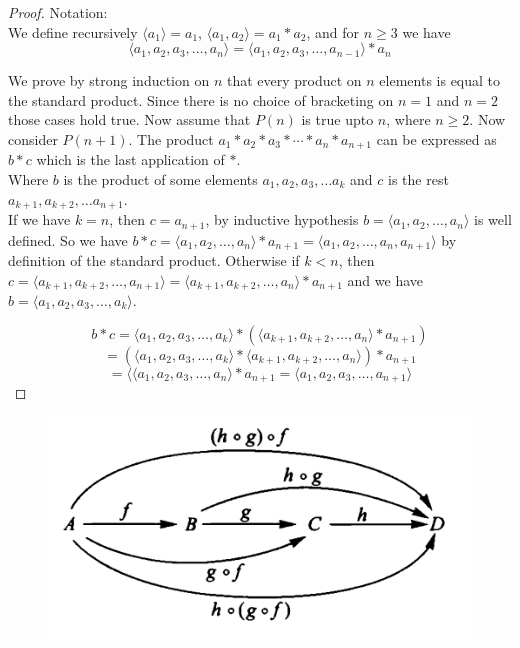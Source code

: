 \documentclass[16pt,a4paper]{article}
\theoremstyle{definition}
\begin{document}
\begin{proof}
Notation:\\
We define recursively $\langle a_1 \rangle = a_1$, $\langle a_1, a_2\rangle = a_1*a_2$, and for $n\geq 3$ we have 
\[\langle a_1, a_2, a_3, \ldots, a_n\rangle = \langle a_1, a_2, a_3, \ldots, a_{n-1}\rangle*a_n\] 

We prove by strong induction on $n$ that every product on $n$ elements is equal to the standard product. Since there is no choice of bracketing on $n=1$ and $n=2$ those cases hold true. Now assume that $P(n)$ is true upto $n$, where $n\geq 2$. Now consider $P(n+1)$. The product $a_1*a_2*a_3*\cdots *a_n * a_{n+1}$ can be expressed as $b*c$ which is the last application of $*$. \\
Where $b$ is the product of some elements $a_1, a_2, a_3, \ldots a_k$ and $c$ is the rest $a_{k+1}, a_{k+2}, \ldots a_{n+1}$. \\

If we have $k=n$, then $c=a_{n+1}$, by inductive hypothesis $b=\langle a_1, a_2, \ldots, a_n\rangle$ is well defined. So we have $b*c = \langle a_1, a_2, \ldots, a_n\rangle * a_{n+1} = \langle a_1, a_2, \ldots, a_n, a_{n+1}\rangle$ by definition of the standard product. Otherwise if $k<n$, then $c=\langle a_{k+1}, a_{k+2}, \ldots, a_{n+1}\rangle = \langle a_{k+1}, a_{k+2}, \ldots, a_{n}\rangle  *a_{n+1}$ and we have $b=\langle a_1, a_2, a_3, \ldots, a_k \rangle$. 

\[b*c = \langle a_1, a_2, a_3, \ldots, a_k \rangle * (\langle a_{k+1}, a_{k+2}, \ldots, a_{n}\rangle  *a_{n+1})\]
\[=(\langle a_1, a_2, a_3, \ldots, a_k \rangle * \langle a_{k+1}, a_{k+2}, \ldots, a_{n}\rangle)  *a_{n+1}\]
\[=\langle \langle a_1, a_2, a_3, \ldots, a_n \rangle *a_{n+1} = \langle a_1, a_2, a_3, \ldots, a_{n+1}\rangle \]


\end{proof}
\begin{figure}[hbtp]
\centering
\includegraphics[scale=1]{figs/fig2.png}
\end{figure}
\end{document}
